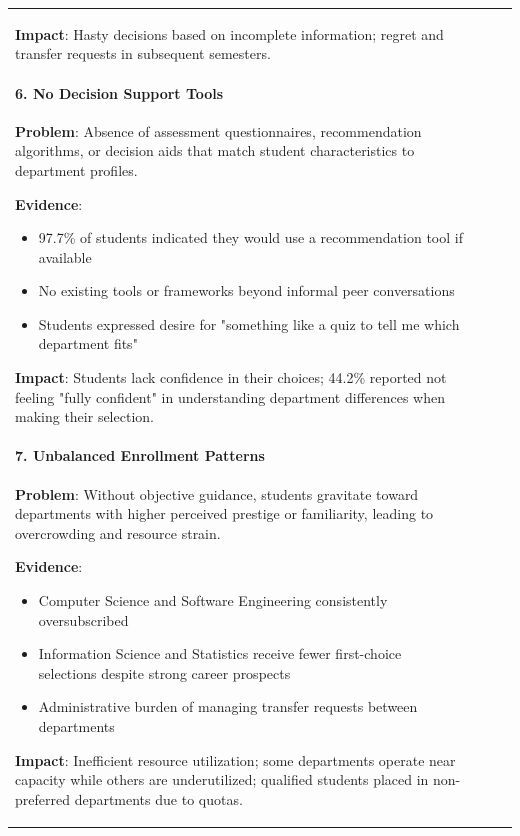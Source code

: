 \documentclass[12pt, a4paper]{article}
\begin{document}
\begin{itemize}[leftmargin=1.5em, itemsep=3pt]
\begin{table}[H]
\begin{tabularx}{\textwidth}{>{\raggedright\arraybackslash}p{0.8cm}>{\raggedright\arraybackslash}p{3.5cm}>{\raggedright\arraybackslash}X>{\raggedright\arraybackslash}p{2.5cm}}
\textbf{Impact}: Hasty decisions based on incomplete information; regret and transfer requests in subsequent semesters.

\paragraph{6. No Decision Support Tools}

\textbf{Problem}: Absence of assessment questionnaires, recommendation algorithms, or decision aids that match student characteristics to department profiles.

\textbf{Evidence}:
\begin{itemize}[leftmargin=1.5em, itemsep=2pt]
    \item 97.7\% of students indicated they would use a recommendation tool if available
    \item No existing tools or frameworks beyond informal peer conversations
    \item Students expressed desire for "something like a quiz to tell me which department fits"
\end{itemize}

\textbf{Impact}: Students lack confidence in their choices; 44.2\% reported not feeling "fully confident" in understanding department differences when making their selection.

\paragraph{7. Unbalanced Enrollment Patterns}

\textbf{Problem}: Without objective guidance, students gravitate toward departments with higher perceived prestige or familiarity, leading to overcrowding and resource strain.

\textbf{Evidence}:
\begin{itemize}[leftmargin=1.5em, itemsep=2pt]
    \item Computer Science and Software Engineering consistently oversubscribed
    \item Information Science and Statistics receive fewer first-choice selections despite strong career prospects
    \item Administrative burden of managing transfer requests between departments
\end{itemize}

\textbf{Impact}: Inefficient resource utilization; some departments operate near capacity while others are underutilized; qualified students placed in non-preferred departments due to quotas.


\end{tabularx}
\end{table}
\end{itemize}
\end{document}
